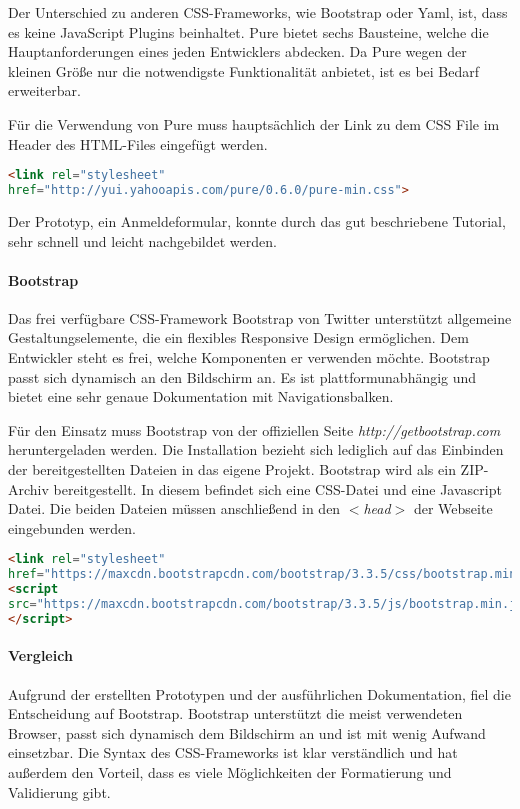 Der Unterschied zu anderen CSS-Frameworks, wie Bootstrap oder Yaml, ist, dass es keine JavaScript Plugins beinhaltet. Pure bietet sechs Bausteine, welche die Hauptanforderungen eines jeden Entwicklers abdecken. Da Pure wegen der kleinen Größe nur die notwendigste Funktionalität anbietet, ist es bei Bedarf erweiterbar.

\newpage

Für die Verwendung von Pure muss hauptsächlich der Link zu dem CSS File im Header des HTML-Files eingefügt werden. \cite{PURE}
\begin{lstlisting}[caption={Pure einbinden \cite{PURE}}, language=HTML]
<link rel="stylesheet" 
href="http://yui.yahooapis.com/pure/0.6.0/pure-min.css">
\end{lstlisting}

Der Prototyp, ein Anmeldeformular, konnte durch das gut beschriebene Tutorial, sehr schnell und leicht nachgebildet werden.

\paragraph{Bootstrap}
Das frei verfügbare CSS-Framework Bootstrap von Twitter unterstützt allgemeine Gestaltungselemente, die ein flexibles Responsive Design ermöglichen. Dem Entwickler steht es frei, welche Komponenten er verwenden möchte. Bootstrap passt sich dynamisch an den Bildschirm an. Es ist plattformunabhängig und bietet eine sehr genaue Dokumentation mit Navigationsbalken.

Für den Einsatz muss Bootstrap von der offiziellen Seite \textit{http://getbootstrap.com} heruntergeladen werden. Die Installation bezieht sich lediglich auf das Einbinden der bereitgestellten Dateien in das eigene Projekt. Bootstrap wird als ein ZIP-Archiv bereitgestellt. In diesem befindet sich eine CSS-Datei und eine Javascript Datei. Die beiden Dateien müssen anschließend in den \textit{$<$head$>$} der Webseite eingebunden werden. \cite{BOOTSTRAP}
\begin{lstlisting}[caption={Bootstrap einbinden \cite{BOOTSTRAP}}, language=HTML]
<link rel="stylesheet"
href="https://maxcdn.bootstrapcdn.com/bootstrap/3.3.5/css/bootstrap.min.css">
<script 
src="https://maxcdn.bootstrapcdn.com/bootstrap/3.3.5/js/bootstrap.min.js">
</script>
\end{lstlisting}

\paragraph{Vergleich}
Aufgrund der erstellten Prototypen und der ausführlichen Dokumentation, fiel die Entscheidung auf Bootstrap. Bootstrap unterstützt die meist verwendeten Browser, passt sich dynamisch dem Bildschirm an und ist mit wenig Aufwand einsetzbar. Die Syntax des CSS-Frameworks ist klar verständlich und hat außerdem den Vorteil, dass es viele Möglichkeiten der Formatierung und Validierung gibt.

